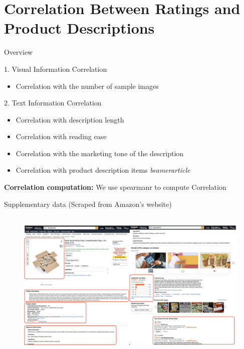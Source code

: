 \section{Correlation Between Ratings and Product Descriptions}

\begin{frame}{Overview}
    
	\begin{block}{1. Visual Information Correlation}
		\begin{itemize}
			\item Correlation with the number of sample images
		\end{itemize}
	\end{block}
    
	\begin{block}{2. Text Information Correlation}
		\begin{itemize}
			\item Correlation with description length
			\item Correlation with reading ease
			\item Correlation with the marketing tone of the description
            \item Correlation with product description items
            \emph{beamerarticle}
		\end{itemize}
	\end{block}

    \textbf{Correlation computation:} We use spearmanr to compute Correlation
\end{frame}

\begin{frame}{Supplementary data (Scraped from Amazon's website)}
	
	\vspace{-5pt}
	\begin{figure}
		\centering
			\includegraphics[height=7.3cm]{pic/collected_amazon_data.png}
	\end{figure}

\end{frame}

